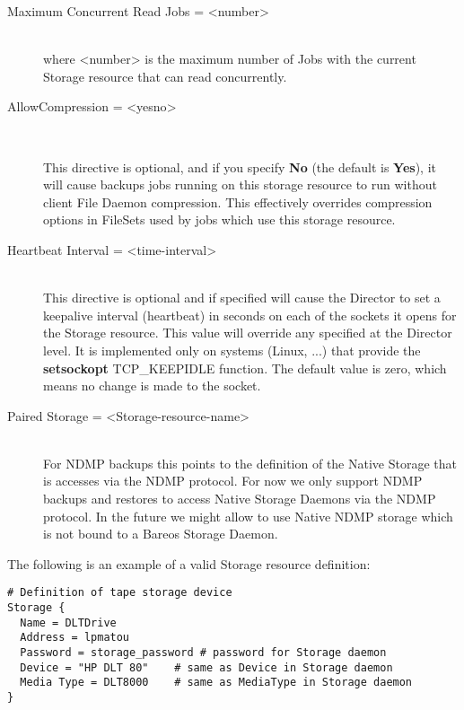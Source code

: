 \begin{description}
\item [Maximum Concurrent Read Jobs = {\textless}number{\textgreater}] \hfill \\
where {\textless}number{\textgreater}  is the maximum number of Jobs with the current
Storage resource that can read concurrently.

\item [AllowCompression = {\textless}yes{\textbar}no{\textgreater}] \hfill \\
\label{AllowCompression}

This directive is optional, and if you specify {\bf No} (the default is {\bf
  Yes}), it will cause backups jobs running on this storage resource to run
without client File Daemon compression.  This effectively overrides
compression options in FileSets used by jobs which use this storage
resource.

\item [Heartbeat Interval = {\textless}time-interval{\textgreater}] \hfill \\
This directive is optional and if specified will cause the Director to
set a keepalive interval (heartbeat) in seconds on each of the sockets
it opens for the Storage resource.  This value will override any
specified at the Director level.  It is implemented only on systems
(Linux, ...) that provide the {\bf setsockopt} TCP\_KEEPIDLE function.
The default value is zero, which means no change is made to the socket.

\item [Paired Storage = {\textless}Storage-resource-name{\textgreater}] \hfill \\
For NDMP backups this points to the definition of the Native Storage
that is accesses via the NDMP protocol. For now we only support NDMP
backups and restores to access Native Storage Daemons via the NDMP
protocol. In the future we might allow to use Native NDMP storage which
is not bound to a Bareos Storage Daemon.
\end{description}

The following is an example of a valid Storage resource definition:

\footnotesize
\begin{verbatim}
# Definition of tape storage device
Storage {
  Name = DLTDrive
  Address = lpmatou
  Password = storage_password # password for Storage daemon
  Device = "HP DLT 80"    # same as Device in Storage daemon
  Media Type = DLT8000    # same as MediaType in Storage daemon
}
\end{verbatim}
\normalsize

